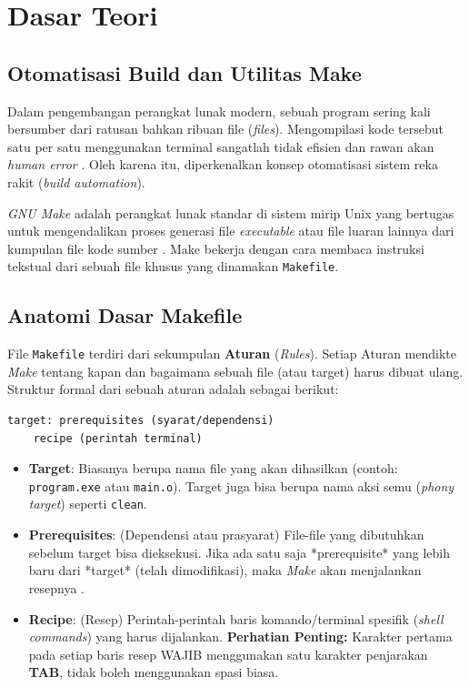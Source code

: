 \newpage
\section{Dasar Teori}

\subsection{Otomatisasi Build dan Utilitas Make}
Dalam pengembangan perangkat lunak modern, sebuah program sering kali bersumber dari ratusan bahkan ribuan file (\textit{files}). Mengompilasi kode tersebut satu per satu menggunakan terminal sangatlah tidak efisien dan rawan akan \textit{human error} \cite{bryant2015computer}. Oleh karena itu, diperkenalkan konsep otomatisasi sistem reka rakit (\textit{build automation}).

\textit{GNU Make} adalah perangkat lunak standar di sistem mirip Unix yang bertugas untuk mengendalikan proses generasi file \textit{executable} atau file luaran lainnya dari kumpulan file kode sumber \cite{stallman2004gnu}. Make bekerja dengan cara membaca instruksi tekstual dari sebuah file khusus yang dinamakan \texttt{Makefile}.

\subsection{Anatomi Dasar Makefile}
File \texttt{Makefile} terdiri dari sekumpulan \textbf{Aturan} (\textit{Rules}). Setiap Aturan mendikte \textit{Make} tentang kapan dan bagaimana sebuah file (atau target) harus dibuat ulang. Struktur formal dari sebuah aturan adalah sebagai berikut:

\begin{verbatim}
target: prerequisites (syarat/dependensi)
    recipe (perintah terminal)
\end{verbatim}

\begin{itemize}
	\item \textbf{Target}: Biasanya berupa nama file yang akan dihasilkan (contoh: \texttt{program.exe} atau \texttt{main.o}). Target juga bisa berupa nama aksi semu (\textit{phony target}) seperti \texttt{clean}.
	\item \textbf{Prerequisites}: (Dependensi atau prasyarat) File-file yang dibutuhkan sebelum target bisa dieksekusi. Jika ada satu saja *prerequisite* yang lebih baru dari *target* (telah dimodifikasi), maka \textit{Make} akan menjalankan resepnya \cite{stallman2004gnu}.
	\item \textbf{Recipe}: (Resep) Perintah-perintah baris komando/terminal spesifik (\textit{shell commands}) yang harus dijalankan. \textbf{Perhatian Penting:} Karakter pertama pada setiap baris resep WAJIB menggunakan satu karakter penjarakan \textbf{TAB}, tidak boleh menggunakan spasi biasa.
\end{itemize}

